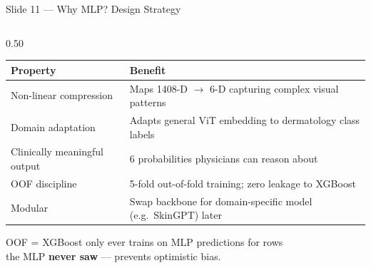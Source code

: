 \documentclass[aspectratio=169, 9pt]{beamer}
\begin{document}
\begin{frame}{Slide 11 --- Why MLP? Design Strategy}
\begin{columns}[T]
\begin{column}{0.50\textwidth}
      \vspace{0.3em}
      {\small
      \begin{tabular}{@{} p{2.6cm} p{4.0cm} @{}}
        \toprule
        Property & Benefit \\
        \midrule
        Non-linear compression
          & Maps 1408-D $\to$ 6-D capturing complex visual patterns \\
        \addlinespace
        Domain adaptation
          & Adapts general ViT embedding to dermatology class labels \\
        \addlinespace
        Clinically meaningful output
          & 6 probabilities physicians can reason about \\
        \addlinespace
        OOF discipline
          & 5-fold out-of-fold training; zero leakage to XGBoost \\
        \addlinespace
        Modular
          & Swap backbone for domain-specific model (e.g.\ SkinGPT) later \\
        \bottomrule
      \end{tabular}
      }

      \vspace{0.4em}
      {\scriptsize\color{gray}
      OOF = XGBoost only ever trains on MLP predictions for rows\\
      the MLP \textbf{never saw} --- prevents optimistic bias.}
    \end{column}

  \end{columns}
\end{frame}
\end{document}
